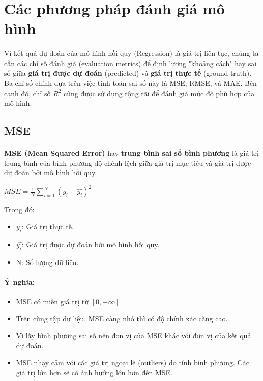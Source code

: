 \newpage
\section{Các phương pháp đánh giá mô hình}

\paragraph{}{Vì kết quả dự đoán của mô hình hồi quy (Regression) là giá trị liên tục, chúng ta cần các chỉ số đánh giá (evaluation metrics) \cite{regression-metrics} để định lượng "khoảng cách" hay sai số giữa \textbf{giá trị được dự đoán} (predicted) và \textbf{giá trị thực tế} (ground truth). Ba chỉ số chính dựa trên việc tính toán sai số này là MSE, RMSE, và MAE. Bên cạnh đó, chỉ số $R^2$ cũng được sử dụng rộng rãi để đánh giá mức độ phù hợp của mô hình.}

\subsection{MSE}

\paragraph{}{\textbf{MSE (Mean Squared Error)} hay \textbf{trung bình sai số bình phương} là giá trị trung bình của bình phương độ chênh lệch giữa giá trị mục tiêu và giá trị được dự đoán bởi mô hình hồi quy.}

\begin{center}
\large $MSE = \frac{1}{N}\sum_{i=1}^{N}(y_{i}-\hat{y_{i}})^2$
\end{center}

Trong đó:
\begin{itemize}
    \item $y_{i}$: Giá trị thực tế.
    \item $\hat{y_{i}}$: Giá trị được dự đoán bởi mô hình hồi quy.
    \item N: Số lượng dữ liệu.
\end{itemize}

\paragraph{Ý nghĩa:}{}
\begin{itemize}
\item MSE có miền giá trị từ $[0,+\infty ]$. 
\item Trên cùng tập dữ liệu, MSE càng nhỏ thì có độ chính xác càng cao. 
\item Vì lấy bình phương sai số nên đơn vị của MSE khác với đơn vị của kết quả dự đoán.
\item MSE nhạy cảm với các giá trị ngoại lệ (outliers) do tính bình phương. Các giá trị lớn hơn sẽ có ảnh hưởng lớn hơn đến MSE.
\end{itemize}


